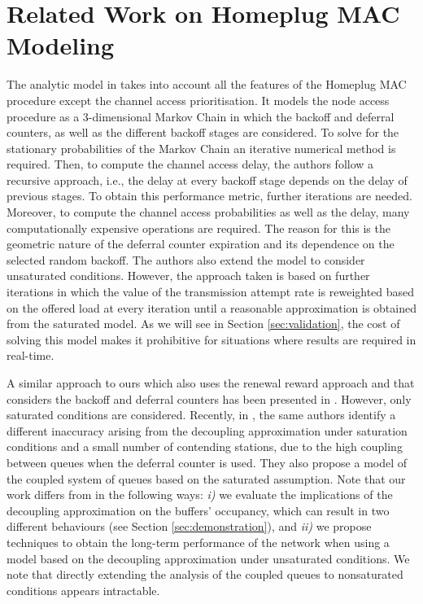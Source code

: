 \documentclass[preprint,12pt]{elsarticle}
\begin{document}
\section{Related Work on Homeplug MAC Modeling}\label{sec:rel_work}



The analytic model in \cite{chung2006performance} takes into account all the features of the Homeplug MAC procedure except the channel access prioritisation. It models the node access procedure as a 3-dimensional Markov Chain in which the backoff and deferral counters, as well as the different backoff stages are considered. To solve for the stationary probabilities of the Markov Chain an iterative numerical method is required. Then, to compute the channel access delay, the authors follow a recursive approach, i.e., the delay at every backoff stage depends on the delay of previous stages. To obtain this performance metric, further iterations are needed. Moreover, to compute the channel access probabilities as well as the delay, many computationally expensive operations are required. The reason for this is the geometric nature of the deferral counter expiration and its dependence on the selected random backoff. The authors also extend the model to consider unsaturated conditions. However, the approach taken is based on further iterations in which the value of the transmission attempt rate is reweighted based on the offered load at every iteration until a reasonable approximation is obtained from the saturated model. As we will see in Section \ref{sec:validation}, the cost of solving this model makes it prohibitive for situations where results are required in real-time.

A similar approach to ours which also uses the renewal reward approach and that considers the backoff and deferral counters has been presented in \cite{vlachou2014performance}. However, only saturated conditions are considered. Recently, in \cite{vlachou2014new}, the same authors identify a different inaccuracy arising from the decoupling approximation under saturation conditions and a small number of contending stations, due to the high coupling between queues when the deferral counter is used. They also propose a model of the coupled system of queues based on the saturated assumption. Note that our work differs from \cite{vlachou2014new} in the following ways: \emph{i)} we evaluate the implications of the decoupling approximation on the buffers' occupancy, which can result in two different behaviours (see Section \ref{sec:demonstration}), and \emph{ii)} we propose techniques to obtain the long-term performance of the network when using a model based on the decoupling approximation under unsaturated conditions. We note that directly extending the analysis of
the coupled queues to nonsaturated conditions appears intractable.
\end{document}

